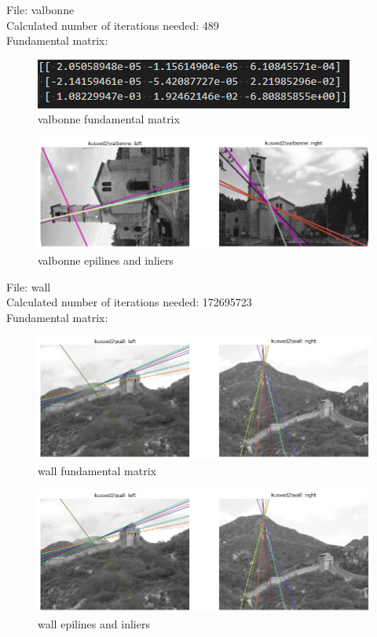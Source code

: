 \documentclass[10pt,a4paper]{article}
\begin{document}
File: valbonne\\
Calculated number of iterations needed: 489\\
Fundamental matrix:
\begin{figure}[H]
	\centering
	\includegraphics[width=0.7\linewidth]{img/valbonnef}
	\caption{valbonne fundamental matrix}
	\label{fig:valbonnef}
\end{figure}
\begin{figure}[H]
	\centering
	\includegraphics[width=0.7\linewidth]{img/valbonne}
	\caption{valbonne epilines and inliers}
	\label{fig:valbonne}
\end{figure}

File: wall\\
Calculated number of iterations needed: 172695723\\
Fundamental matrix:
\begin{figure}[H]
	\centering
	\includegraphics[width=0.7\linewidth]{img/wall}
	\caption{wall fundamental matrix}
	\label{fig:wallf}
\end{figure}
\begin{figure}[H]
	\centering
	\includegraphics[width=0.7\linewidth]{img/wall}
	\caption{wall epilines and inliers}
	\label{fig:wall}
\end{figure}
\end{document}
